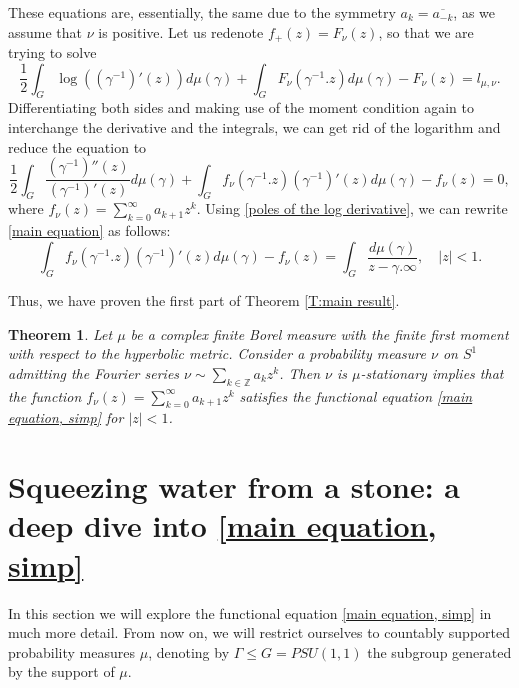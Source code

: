 \documentclass[11pt]{article}
\newtheorem{theorem}{Theorem}[section]
\begin{document}
These equations are, essentially, the same due to the symmetry $a_k = \overline{a_{-k}}$, as we assume that $\nu$ is positive. Let us redenote $f_+(z) = F_\nu(z)$, so that we are trying to solve
\begin{equation}
	\frac{1}{2} \int_G \log((\gamma^{-1})'(z))  d\mu(\gamma) + \int_G F_\nu(\gamma^{-1}.z)  d\mu(\gamma) - F_\nu(z) = l_{\mu, \nu}.
\end{equation}
Differentiating both sides and making use of the moment condition again to interchange the derivative and the integrals, we can get rid of the logarithm and reduce the equation to
\begin{equation}
	\label{main equation}
	\frac{1}{2} \int_G \frac{(\gamma^{-1})''(z)}{(\gamma^{-1})'(z)}  d\mu(\gamma) + \int_G f_\nu(\gamma^{-1}.z)(\gamma^{-1})'(z)  d\mu(\gamma) - f_\nu(z) = 0,
\end{equation}
where $f_\nu(z) = \sum_{k=0}^{\infty} a_{k+1} z^k$.
Using \eqref{poles of the log derivative}, we can rewrite \eqref{main equation} as follows:
\begin{equation}
	\label{main equation, simp}
	\int_G f_\nu(\gamma^{-1}.z)(\gamma^{-1})'(z)  d\mu(\gamma) - f_\nu(z) = \int_G \frac{d \mu(\gamma)}{z - \gamma.\infty}, \quad |z| < 1.
\end{equation}

Thus, we have proven the first part of Theorem \ref{T:main result}.

\begin{theorem}
	Let $\mu$ be a complex finite Borel measure with the finite first moment with respect to the hyperbolic metric. Consider a probability measure $\nu$ on $S^1$ admitting the Fourier series $\nu \sim \sum_{k \in \mathbb{Z}} a_k z^k$. Then $\nu$ is $\mu$-stationary implies that the function $f_\nu(z) = \sum_{k=0}^\infty a_{k+1} z^k$ satisfies the functional equation \eqref{main equation, simp} for $|z| < 1$.
\end{theorem}


\section{Squeezing water from a stone: a deep dive into \eqref{main equation, simp}}
\label{Squeezing water from a stone}
In this section we will explore the functional equation \eqref{main equation, simp} in much more detail. From now on, we will restrict ourselves to countably supported probability measures $\mu$, denoting by $\Gamma \le G = PSU(1,1)$ the subgroup generated by the support of $\mu$.
\end{document}

